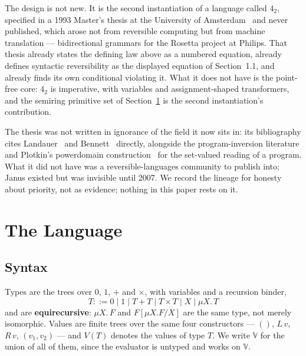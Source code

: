 \documentclass[runningheads,envcountsame]{llncs}
\begin{document}
The design is not new. It is the second instantiation of a language called $4_2$,
specified in a 1993 Master's thesis at the University of Amsterdam~\cite{jansen}
and never published, which arose not from reversible computing but from machine
translation --- bidirectional grammars for the Rosetta project at Philips. That
thesis already states the defining law above as a numbered equation, already
defines syntactic reversibility as the displayed equation of Section~1.1, and
already finds its own conditional violating it. What it does not have is the
point-free core: $4_2$ is imperative, with variables and assignment-shaped
transformers, and the semiring primitive set of Section~\ref{sec:lang} is the
second instantiation's contribution.

The thesis was not written in ignorance of the field it now sits in: its
bibliography cites Landauer~\cite{landauer} and Bennett~\cite{bennett} directly,
alongside the program-inversion literature and Plotkin's powerdomain
construction~\cite{plotkin} for the set-valued reading of a program. What it did
not have was a reversible-languages community to publish into; Janus existed but
was invisible until 2007. We record the lineage for honesty about priority, not
as evidence; nothing in this paper rests on it.

\section{The Language}\label{sec:lang}

\subsection{Syntax}

Types are the trees over $0$, $1$, $+$ and $\times$, with variables and a
recursion binder,
\[
    T ::= 0 \mid 1 \mid T + T \mid T \times T \mid X \mid \mu X.\,T
\]
and are \textbf{equirecursive}: $\mu X.\,F$ and $F[\mu X.F/X]$ are the same type,
not merely isomorphic. Values are finite trees over the same four constructors ---
$()$, $L\,v$, $R\,v$, $(v_1,v_2)$ --- and $V(T)$ denotes the values of type $T$. We
write $\mathbb{V}$ for the union of all of them, since the evaluator is untyped
and works on $\mathbb{V}$.
\end{document}
